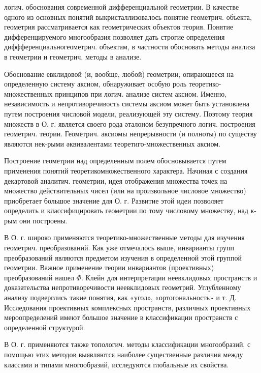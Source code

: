 \documentclass[10pt]{article}
\begin{document}
логич. обоснования современной дифференциальной геометрии. В качестве одного из основных понятий выкристаллизовалось понятие геометрич. объекта, геометрия рассматривается как геометрических объектов теория. Понятие дифференцируемого многообразия позволяет дать строгие определения диффференциальногеометрич. объектам, в частности обосновать методы анализа в геометрии и геометрич. методы в анализе.



Обоснование евклидовой (и, вообще, любой) геометрии, опирающееся на определенную систему аксиом, обнаруживает особую роль теоретико-множественных принципов при логич. анализе систем аксиом. Именно, независимость и непротиворечивость системы аксиом может быть установлена путем построения числовой модели, реализующей эту систему. Поэтому теория множеств в О. г. является своего рода әталоном безупречного логич. построения геометрич. теории. Геометрич. аксиомы непрерывности (и полноты) по существу являются нек-рыми әквивалентами теоретиго-множественных аксиом.



Построение геометрии над определенным полем обосновывается путем применения понятий теоретикомножественного характера. Начиная с создания декартовой аналитич. геометрии, идея отображения множества точек на множество действительных чисел (или на произвольное числовое множество) приобретает большое значение для О. г. Развитие этой идеи позволяет определить и классифицировать геометрии по тому числовому множеству, над к-рым они построены.



В О. г. широко применяются теоретико-множественные методы для изучения геометрич. преобразований. Как уже отмечалось выше, инварианты групп преобразований являются предметом изучения в определенной этой группой геометрии. Важное применение теории инвариантов (проективных) преобразований нашел $\Phi$. Клейн для интерпретации неевклидовых пространств и доказательства непротиворечивости неевклидовых геометрий. Углубленному анализу подверглись такие понятия, как «угол», «ортогональность» и т. Д. Исследования проективных комплексных пространств, различных проективных мероопределений имеют большое значение в классификации пространств с определенной структурой.



В О. г. применяются также топологич. методы классификации многообразий, с помощью этих методов выявляются наиболее существенные различия между классами и типами многообразий, исследуются глобальные их свойства.
\end{document}
